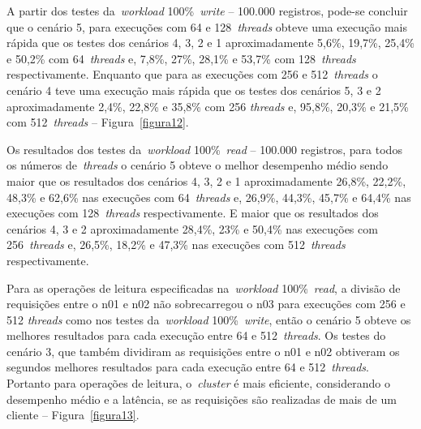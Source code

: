 \documentclass[12pt]{article}
\begin{document}
A partir dos testes da~\emph{workload} 100\%~\emph{write} -- 100.000 registros, pode-se concluir que o cenário 5, para execuções com 64 e 128~\emph{threads} obteve uma execução mais rápida que os testes dos cenários 4, 3, 2 e 1 aproximadamente 5,6\%, 19,7\%, 25,4\% e 50,2\% com 64~\emph{threads} e, 7,8\%, 27\%, 28,1\% e 53,7\% com 128~\emph{threads} respectivamente. Enquanto que para as execuções com 256 e 512~\emph{threads} o cenário 4 teve uma execução mais rápida que os testes dos cenários 5, 3 e 2 aproximadamente 2,4\%, 22,8\% e 35,8\% com 256 \emph{threads} e, 95,8\%, 20,3\% e 21,5\% com 512~\emph{threads} -- Figura~\ref{figura12}.

Os resultados dos testes da~\emph{workload} 100\%~\emph{read} -- 100.000 registros, para todos os números de~\emph{threads} o cenário 5 obteve o melhor desempenho médio sendo maior que os resultados dos cenários 4, 3, 2 e 1 aproximadamente 26,8\%, 22,2\%, 48,3\% e 62,6\% nas execuções com 64~\emph{threads} e, 26,9\%, 44,3\%, 45,7\% e 64,4\% nas execuções com 128~\emph{threads} respectivamente. E maior que os resultados dos cenários 4, 3 e 2 aproximadamente 28,4\%, 23\% e 50,4\% nas execuções com 256~\emph{threads} e, 26,5\%, 18,2\% e 47,3\% nas execuções com 512~\emph{threads} respectivamente.

Para as operações de leitura especificadas na~\emph{workload} 100\%~\emph{read}, a divisão de requisições entre o n01 e n02 não sobrecarregou o n03 para execuções com 256 e 512 \emph{threads} como nos testes da~\emph{workload} 100\%~\emph{write}, então o cenário 5 obteve os melhores resultados para cada execução entre 64 e 512~\emph{threads}. Os testes do cenário 3, que também dividiram as requisições entre o n01 e n02 obtiveram os segundos melhores resultados para cada execução entre 64 e 512~\emph{threads}. Portanto para operações de leitura, o~\emph{cluster} é mais eficiente, considerando o desempenho médio e a latência, se as requisições são realizadas de mais de um cliente -- Figura~\ref{figura13}.
\end{document}
